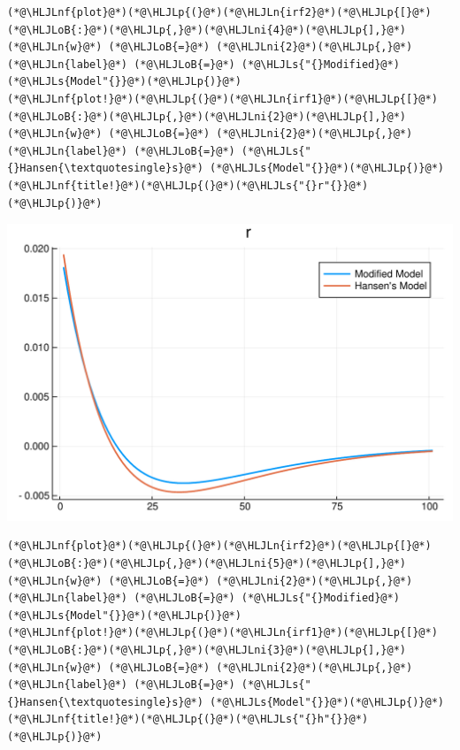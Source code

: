 \documentclass[12pt,a4paper]{article}
\newcommand{\HLJLn}[1]{#1}
\newcommand{\HLJLnf}[1]{\textcolor[RGB]{66,102,213}{#1}}
\newcommand{\HLJLs}[1]{\textcolor[RGB]{201,61,57}{#1}}
\newcommand{\HLJLni}[1]{\textcolor[RGB]{59,151,46}{#1}}
\newcommand{\HLJLoB}[1]{\textcolor[RGB]{102,102,102}{\textbf{#1}}}
\newcommand{\HLJLp}[1]{#1}
\begin{document}
\begin{lstlisting}
(*@\HLJLnf{plot}@*)(*@\HLJLp{(}@*)(*@\HLJLn{irf2}@*)(*@\HLJLp{[}@*)(*@\HLJLoB{:}@*)(*@\HLJLp{,}@*)(*@\HLJLni{4}@*)(*@\HLJLp{],}@*) (*@\HLJLn{w}@*) (*@\HLJLoB{=}@*) (*@\HLJLni{2}@*)(*@\HLJLp{,}@*) (*@\HLJLn{label}@*) (*@\HLJLoB{=}@*) (*@\HLJLs{"{}Modified}@*) (*@\HLJLs{Model"{}}@*)(*@\HLJLp{)}@*)
(*@\HLJLnf{plot!}@*)(*@\HLJLp{(}@*)(*@\HLJLn{irf1}@*)(*@\HLJLp{[}@*)(*@\HLJLoB{:}@*)(*@\HLJLp{,}@*)(*@\HLJLni{2}@*)(*@\HLJLp{],}@*) (*@\HLJLn{w}@*) (*@\HLJLoB{=}@*) (*@\HLJLni{2}@*)(*@\HLJLp{,}@*) (*@\HLJLn{label}@*) (*@\HLJLoB{=}@*) (*@\HLJLs{"{}Hansen{\textquotesingle}s}@*) (*@\HLJLs{Model"{}}@*)(*@\HLJLp{)}@*)
(*@\HLJLnf{title!}@*)(*@\HLJLp{(}@*)(*@\HLJLs{"{}r"{}}@*)(*@\HLJLp{)}@*)
\end{lstlisting}

\includegraphics[width=\linewidth]{figures/yvan_6_1.pdf}

\begin{lstlisting}
(*@\HLJLnf{plot}@*)(*@\HLJLp{(}@*)(*@\HLJLn{irf2}@*)(*@\HLJLp{[}@*)(*@\HLJLoB{:}@*)(*@\HLJLp{,}@*)(*@\HLJLni{5}@*)(*@\HLJLp{],}@*) (*@\HLJLn{w}@*) (*@\HLJLoB{=}@*) (*@\HLJLni{2}@*)(*@\HLJLp{,}@*) (*@\HLJLn{label}@*) (*@\HLJLoB{=}@*) (*@\HLJLs{"{}Modified}@*) (*@\HLJLs{Model"{}}@*)(*@\HLJLp{)}@*)
(*@\HLJLnf{plot!}@*)(*@\HLJLp{(}@*)(*@\HLJLn{irf1}@*)(*@\HLJLp{[}@*)(*@\HLJLoB{:}@*)(*@\HLJLp{,}@*)(*@\HLJLni{3}@*)(*@\HLJLp{],}@*) (*@\HLJLn{w}@*) (*@\HLJLoB{=}@*) (*@\HLJLni{2}@*)(*@\HLJLp{,}@*) (*@\HLJLn{label}@*) (*@\HLJLoB{=}@*) (*@\HLJLs{"{}Hansen{\textquotesingle}s}@*) (*@\HLJLs{Model"{}}@*)(*@\HLJLp{)}@*)
(*@\HLJLnf{title!}@*)(*@\HLJLp{(}@*)(*@\HLJLs{"{}h"{}}@*)(*@\HLJLp{)}@*)
\end{lstlisting}
\end{document}
